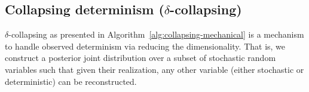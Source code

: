 \documentclass[]{article}
\begin{document}
\subsection{Collapsing determinism ($\delta$-collapsing)}%
\label{sect:collapse}
$\delta$-collapsing as presented in Algorithm~\ref{alg:collapsing-mechanical}
is a mechanism to handle observed determinism via reducing the dimensionality. 
That is, 
we construct a posterior joint distribution over a subset of stochastic random variables such that given their realization, any other variable (either stochastic or deterministic)
can be reconstructed.%
\end{document}

